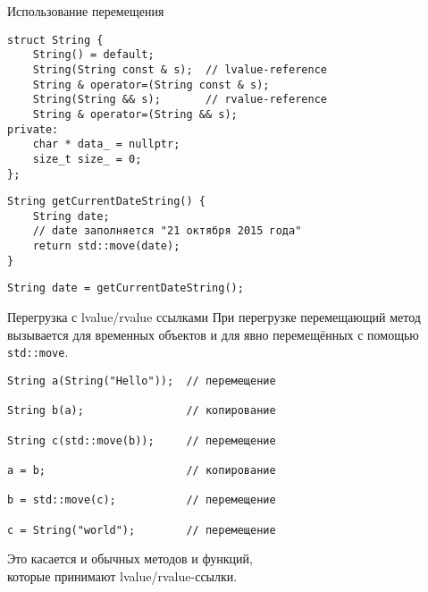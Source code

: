 \documentclass{beamer}
\begin{document}
\begin{frame}[fragile]{Использование перемещения}
\begin{lstlisting}
struct String {
    String() = default;
    String(String const & s);  // lvalue-reference
    String & operator=(String const & s);
    String(String && s);       // rvalue-reference
    String & operator=(String && s);
private:
    char * data_ = nullptr;
    size_t size_ = 0;
};
\end{lstlisting}

\begin{lstlisting}
String getCurrentDateString() {
    String date;
    // date заполняется "21 октября 2015 года"
    return std::move(date);
}
\end{lstlisting}

\begin{lstlisting}
String date = getCurrentDateString();
\end{lstlisting}
\end{frame}

\begin{frame}[fragile]{Перегрузка с lvalue/rvalue ссылками}
При перегрузке перемещающий метод вызывается для временных объектов
и для явно перемещённых с помощью \texttt{std::move}.
\begin{lstlisting}
String a(String("Hello"));  // перемещение

String b(a);                // копирование

String c(std::move(b));     // перемещение

a = b;                      // копирование

b = std::move(c);           // перемещение

c = String("world");        // перемещение
\end{lstlisting}

Это касается и обычных методов и функций, \\ которые принимают
lvalue/rvalue-ссылки.  
\end{frame}
\end{document}
